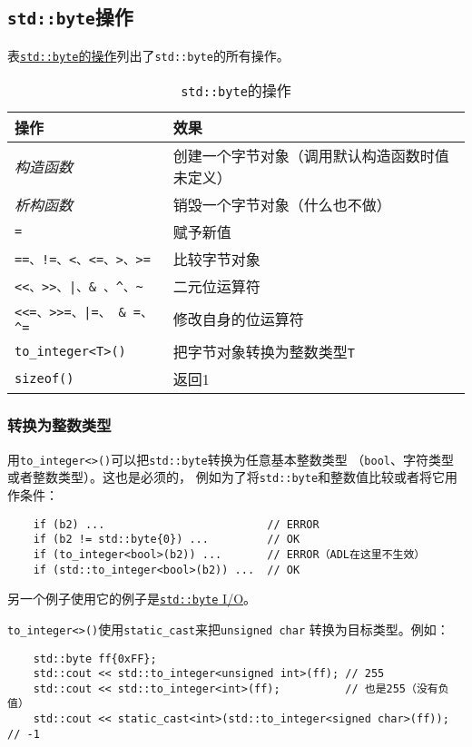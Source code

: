 \subsection{\texttt{std::byte}操作}
表\hyperref[t18.1]{\texttt{std::byte}的操作}列出了\texttt{std::byte}的所有操作。
\begin{table}[htb]
    \centering
    \begin{tabular}{l|l}
        \hline
        \textbf{操作} & \textbf{效果} \\
        \hline
        \emph{构造函数} & 创建一个字节对象（调用默认构造函数时值未定义） \\
        \emph{析构函数} & 销毁一个字节对象（什么也不做） \\
        \texttt{=} & 赋予新值 \\
        \texttt{==、!=、<、<=、>、>=} & 比较字节对象 \\
        \texttt{<<、>>、|、\& 、\textasciicircum、\textasciitilde} & 二元位运算符    \\
        \texttt{<<=、>>=、|=、 \& =、\textasciicircum =}              & 修改自身的位运算符 \\
        \texttt{to\_integer<T>()} & 把字节对象转换为整数类型\texttt{T} \\
        \texttt{sizeof()} & 返回1 \\
        \hline
    \end{tabular}
    \caption{\texttt{std::byte}的操作}
    \label{t18.1}
\end{table}

\subsubsection{转换为整数类型}
用\texttt{to\_integer<>()}可以把\texttt{std::byte}转换为任意基本整数类型
（\texttt{bool}、字符类型或者整数类型）。这也是必须的，
例如为了将\texttt{std::byte}和整数值比较或者将它用作条件：
\begin{lstlisting}
    if (b2) ...                         // ERROR
    if (b2 != std::byte{0}) ...         // OK
    if (to_integer<bool>(b2)) ...       // ERROR（ADL在这里不生效）
    if (std::to_integer<bool>(b2)) ...  // OK
\end{lstlisting}
另一个例子使用它的例子是\hyperref[ch18.2.2.2]{\texttt{std::byte} I/O}。

\texttt{to\_integer<>()}使用\texttt{static\_cast}来把\texttt{unsigned char}
转换为目标类型。例如：
\begin{lstlisting}
    std::byte ff{0xFF};
    std::cout << std::to_integer<unsigned int>(ff); // 255
    std::cout << std::to_integer<int>(ff);          // 也是255（没有负值）
    std::cout << static_cast<int>(std::to_integer<signed char>(ff)); // -1
\end{lstlisting}

